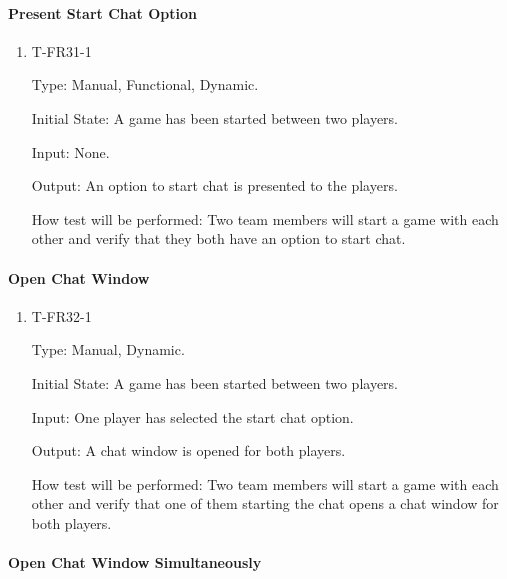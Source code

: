 \documentclass[12pt, titlepage]{article}
\begin{document}
    \paragraph{Present Start Chat Option}
    
        \begin{enumerate}
        
            \item{T-FR31-1\\}
            
                Type: Manual, Functional, Dynamic.
                					
                Initial State: A game has been started between two players.
                					
                Input: None.
                					
                Output: An option to start chat is presented to the players.
                					
                How test will be performed: Two team members will start a game with each other and verify that they both have an option to start chat.
        
        \end{enumerate}
    
    \paragraph{Open Chat Window}

        \begin{enumerate}

        \item{T-FR32-1\\}

            Type: Manual, Dynamic.
            					
            Initial State: A game has been started between two players.
            					
            Input: One player has selected the start chat option.
            					
            Output: A chat window is opened for both players.

            How test will be performed: Two team members will start a game with each other and verify that one of them starting the chat opens a chat window for both players.

        \end{enumerate}
        
    \paragraph{Open Chat Window Simultaneously}
\end{document}
